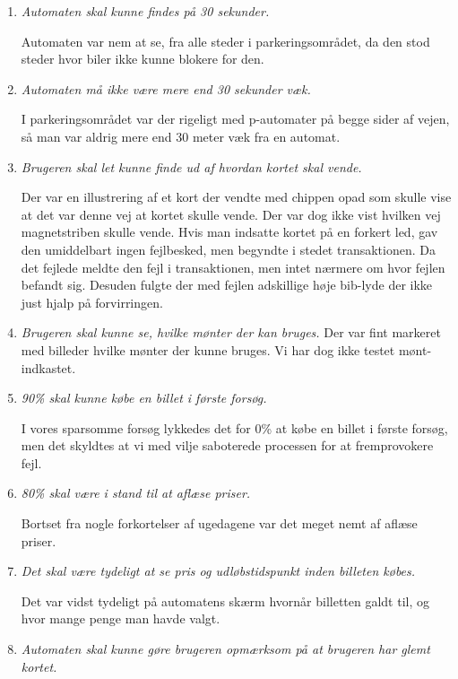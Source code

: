 \documentclass[10pt]{article}
\begin{document}
\begin{enumerate}
\item {\it Automaten skal kunne findes på 30 sekunder.}

  Automaten var nem at se, fra alle steder i parkeringsområdet, da den
  stod steder hvor biler ikke kunne blokere for den. 

\item {\it Automaten må ikke være mere end 30 sekunder væk.}

  I parkeringsområdet var der rigeligt med p-automater på begge sider af
  vejen, så man var aldrig mere end 30 meter væk fra en automat.

\item {\it Brugeren skal let kunne finde ud af hvordan kortet skal vende.}

  Der var en illustrering af et kort der vendte med chippen opad som
  skulle vise at det var denne vej at kortet skulle vende. Der var dog
  ikke vist hvilken vej magnetstriben skulle vende. Hvis man indsatte
  kortet på en forkert led, gav den umiddelbart ingen fejlbesked, men
  begyndte i stedet transaktionen. Da det fejlede meldte den fejl i
  transaktionen, men intet nærmere om hvor fejlen befandt sig. Desuden
  fulgte der med fejlen adskillige høje bib-lyde der ikke just hjalp på
  forvirringen.   

\item {\it Brugeren skal kunne se, hvilke mønter der kan bruges.}
  Der var fint markeret med billeder hvilke mønter der kunne bruges. Vi
  har dog ikke testet mønt-indkastet.

\item {\it 90\% skal kunne købe en billet i første forsøg.}

  I vores sparsomme forsøg lykkedes det for 0\% at købe en billet i
  første forsøg, men det skyldtes at vi med vilje saboterede processen
  for at fremprovokere fejl.

\item {\it 80\% skal være i stand til at aflæse priser.}

  Bortset fra nogle forkortelser af ugedagene var det meget nemt af
  aflæse priser. 

\item {\it Det skal være tydeligt at se pris og udløbstidspunkt inden billeten
  købes.}

  Det var vidst tydeligt på automatens skærm hvornår billetten galdt
  til, og hvor mange penge man havde valgt. 

\item {\it Automaten skal kunne gøre brugeren opmærksom på at brugeren har
  glemt kortet.}


\end{enumerate}
\end{document}
